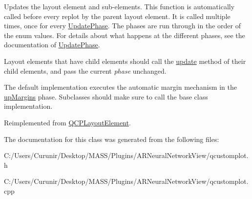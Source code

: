 Updates the layout element and sub-\/elements. This function is automatically called before every replot by the parent layout element. It is called multiple times, once for every \hyperlink{class_q_c_p_layout_element_a0d83360e05735735aaf6d7983c56374d}{Update\+Phase}. The phases are run through in the order of the enum values. For details about what happens at the different phases, see the documentation of \hyperlink{class_q_c_p_layout_element_a0d83360e05735735aaf6d7983c56374d}{Update\+Phase}.

Layout elements that have child elements should call the \hyperlink{class_q_c_p_layout_a48ecc9c98ea90b547c3e27a931a8f7bd}{update} method of their child elements, and pass the current {\itshape phase} unchanged.

The default implementation executes the automatic margin mechanism in the \hyperlink{class_q_c_p_layout_element_a0d83360e05735735aaf6d7983c56374dae1924e6bd8696f20d2eb224d8084a268}{up\+Margins} phase. Subclasses should make sure to call the base class implementation. 

Reimplemented from \hyperlink{class_q_c_p_layout_element_a929c2ec62e0e0e1d8418eaa802e2af9b}{Q\+C\+P\+Layout\+Element}.



The documentation for this class was generated from the following files\+:\begin{DoxyCompactItemize}
\item 
C\+:/\+Users/\+Curunir/\+Desktop/\+M\+A\+S\+S/\+Plugins/\+A\+R\+Neural\+Network\+View/qcustomplot.\+h\item 
C\+:/\+Users/\+Curunir/\+Desktop/\+M\+A\+S\+S/\+Plugins/\+A\+R\+Neural\+Network\+View/qcustomplot.\+cpp\end{DoxyCompactItemize}
